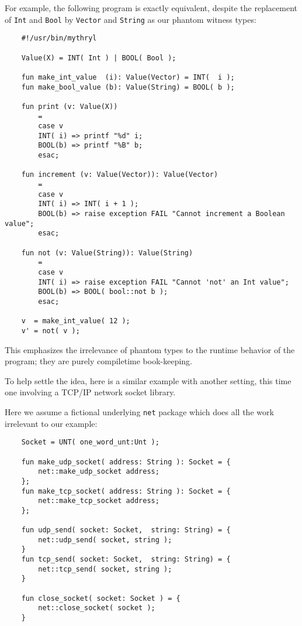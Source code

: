 For example, the following program is exactly equivalent, despite the replacement 
of {\tt Int} and {\tt Bool} by {\tt Vector} and {\tt String} as our phantom 
witness types:

\begin{verbatim}
    #!/usr/bin/mythryl

    Value(X) = INT( Int ) | BOOL( Bool ); 

    fun make_int_value  (i): Value(Vector) = INT(  i );
    fun make_bool_value (b): Value(String) = BOOL( b );

    fun print (v: Value(X))
        =
        case v
        INT( i) => printf "%d" i;
        BOOL(b) => printf "%B" b;
        esac;
       
    fun increment (v: Value(Vector)): Value(Vector)
        =
        case v
        INT( i) => INT( i + 1 );
        BOOL(b) => raise exception FAIL "Cannot increment a Boolean value";
        esac;

    fun not (v: Value(String)): Value(String)
        =
        case v
        INT( i) => raise exception FAIL "Cannot 'not' an Int value";
        BOOL(b) => BOOL( bool::not b );
        esac;

    v  = make_int_value( 12 );
    v' = not( v );
\end{verbatim}

This emphasizes the irrelevance of phantom types to the runtime behavior of 
the program;  they are purely compiletime book-keeping.

To help settle the idea, here is a similar example with another setting, 
this time one involving a TCP/IP network socket library.

Here we assume a fictional underlying {\tt net} package which does 
all the work irrelevant to our example:

\begin{verbatim}
    Socket = UNT( one_word_unt:Unt );

    fun make_udp_socket( address: String ): Socket = {
        net::make_udp_socket address;
    };
    fun make_tcp_socket( address: String ): Socket = {
        net::make_tcp_socket address;
    };

    fun udp_send( socket: Socket,  string: String) = {
        net::udp_send( socket, string );
    }
    fun tcp_send( socket: Socket,  string: String) = {
        net::tcp_send( socket, string );
    }

    fun close_socket( socket: Socket ) = {
        net::close_socket( socket );
    }    
\end{verbatim}

